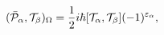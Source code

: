 \begin{equation}
(\bar{{\cal P}}_{\alpha},{\cal T}_{\beta})_{\Omega}=\frac{1}{2}%
i\hbar\lbrack{\cal T}_{\alpha},{\cal T}_{\beta}](-1)^{\varepsilon
_{\alpha}},\label{2.7}%
\end{equation}


